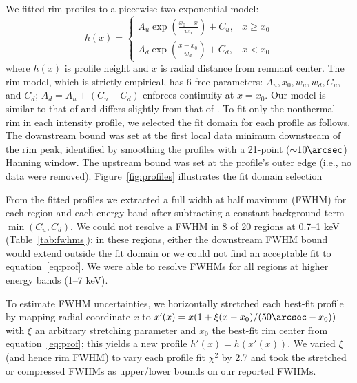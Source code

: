 \documentclass[manuscript]{aastex}  %
\newcommand*{\abt}{\mathord{\sim}} %
\begin{document}
We fitted rim profiles to a piecewise two-exponential model:
\begin{equation} \label{eq:prof}
    h(x) =
    \begin{cases}
        A_u \exp \left(\frac{x_0 - x}{w_u}\right) + C_u, &x \geq x_0 \\
        A_d \exp \left(\frac{x - x_0}{w_d}\right) + C_d, &x < x_0
    \end{cases}
\end{equation}
where $h(x)$ is profile height and $x$ is radial distance from remnant center.
The rim model, which is strictly empirical, has 6 free parameters:
$A_u, x_0, w_u, w_d, C_u$, and $C_d$; $A_d = A_u + (C_u - C_d)$ enforces
continuity at $x=x_0$. Our model is similar to that of \citet{bamba2003,
bamba2005-hist} and differs slightly from that of .
To fit only the nonthermal rim in each intensity profile, we selected the fit
domain for each profile as follows.  The downstream bound was set at the first
local data minimum downstream of the rim peak, identified by smoothing the
profiles with a 21-point ($\abt 10\arcsec$) Hanning window.  The upstream bound
was set at the profile's outer edge (i.e., no data were removed).
Figure~\ref{fig:profiles} illustrates the fit domain selection

\begin{figure*}%
    \iftoggle{manuscript}{
        \epsscale{1}
    }{}
    \caption{Best fit profiles with measured FWHMs demarcated for each energy
        band in Region 1 (top) and Region 16 (bottom).  Energy bands increase
        from left to right.  Data points in red were excluded from profile
        fitting domains as described in text.}
    \label{fig:profiles}
\end{figure*}

From the fitted profiles we extracted a full width at half maximum (FWHM) for
each region and each energy band after subtracting a constant background term
$\min(C_u, C_d)$.  We could not resolve a FWHM in 8 of 20 regions at 0.7--1 keV
(Table~\ref{tab:fwhms}); in these regions, either the downstream FWHM bound
would extend outside the fit domain or we could not find an acceptable fit to
equation~\eqref{eq:prof}.  We were able to resolve FWHMs for all regions at
higher energy bands (1--7 keV).

To estimate FWHM uncertainties, we horizontally stretched each best-fit
profile by mapping radial coordinate $x$ to
$x'(x) = x (1 + \xi (x-x_0)/(50\arcsec-x_0))$ with $\xi$ an arbitrary stretching
parameter and $x_0$ the best-fit rim center from equation~\eqref{eq:prof};
this yields a new profile $h'(x) = h(x'(x))$.
We varied $\xi$ (and hence rim FWHM) to vary each profile fit $\chi^2$ by 2.7
and took the stretched or compressed FWHMs as upper/lower bounds on our
reported FWHMs.
\end{document}
